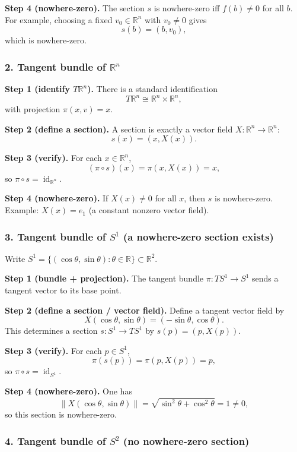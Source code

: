 \documentclass[12pt,a4paper]{article}
\DeclareMathOperator{\id}{id}
\theoremstyle{notespace}
\begin{document}
\textbf{Step 4 (nowhere-zero).} The section $s$ is nowhere-zero iff $f(b)\neq 0$ for all $b$.
For example, choosing a fixed $v_0\in \mathbb{R}^n$ with $v_0\neq 0$ gives
\[
s(b)=(b,v_0),
\]
which is nowhere-zero.

\subsubsection{2. Tangent bundle of $\mathbb{R}^n$}

\textbf{Step 1 (identify $T\mathbb{R}^n$).} There is a standard identification
\[
T\mathbb{R}^n \cong \mathbb{R}^n\times \mathbb{R}^n,
\]
with projection $\pi(x,v)=x$.

\textbf{Step 2 (define a section).} A section is exactly a vector field $X:\mathbb{R}^n\to \mathbb{R}^n$:
\[
s(x)=(x,X(x)).
\]

\textbf{Step 3 (verify).} For each $x\in \mathbb{R}^n$,
\[
(\pi\circ s)(x)=\pi(x,X(x))=x,
\]
so $\pi\circ s=\id_{\mathbb{R}^n}$.

\textbf{Step 4 (nowhere-zero).} If $X(x)\neq 0$ for all $x$, then $s$ is nowhere-zero.
Example: $X(x)=e_1$ (a constant nonzero vector field).

\subsubsection{3. Tangent bundle of $S^1$ (a nowhere-zero section exists)}

Write $S^1=\{(\cos\theta,\sin\theta):\theta\in \mathbb{R}\}\subset \mathbb{R}^2$.

\textbf{Step 1 (bundle + projection).} The tangent bundle $\pi:TS^1\to S^1$ sends a tangent vector to its base point.

\textbf{Step 2 (define a section / vector field).} Define a tangent vector field by
\[
X(\cos\theta,\sin\theta)=(-\sin\theta,\cos\theta).
\]
This determines a section $s:S^1\to TS^1$ by $s(p)=(p,X(p))$.

\textbf{Step 3 (verify).} For each $p\in S^1$,
\[
\pi(s(p))=\pi(p,X(p))=p,
\]
so $\pi\circ s=\id_{S^1}$.

\textbf{Step 4 (nowhere-zero).} One has
\[
\|X(\cos\theta,\sin\theta)\|=\sqrt{\sin^2\theta+\cos^2\theta}=1\neq 0,
\]
so this section is nowhere-zero.

\subsubsection{4. Tangent bundle of $S^2$ (no nowhere-zero section)}
\end{document}
